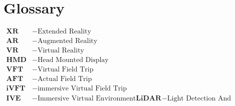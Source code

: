 \chapter*{Glossary}
\begin{align*}
    \textbf{XR} &- \text{Extended Reality} \\
    \textbf{AR} &- \text{Augmented Reality} \\
    \textbf{VR} &- \text{Virtual Reality} \\
    \textbf{HMD} &- \text{Head Mounted Display} \\
    \textbf{VFT} &- \text{Virtual Field Trip} \\
    \textbf{AFT} &- \text{Actual Field Trip} \\
    \textbf{iVFT} &- \text{immersive Virtual Field Trip} \\
    \textbf{IVE} &- \text{Immersive Virtual Environment}
    \textbf{LiDAR} &- \text{Light Detection And Ranging} \\
\end{align*}

